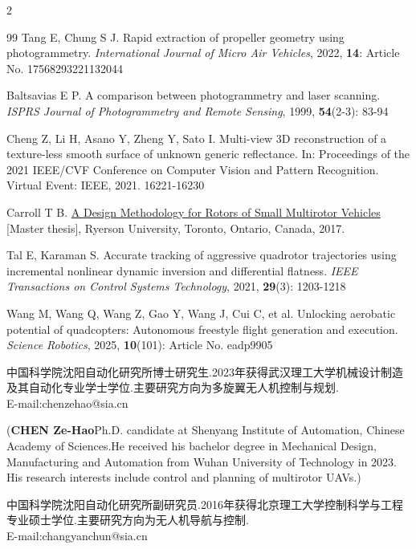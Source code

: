 \documentclass{aas}
\begin{document}
\begin{multicols}{2}
\begin{thebibliography}{99}
 Tang E, Chung S J. Rapid extraction of propeller geometry using photogrammetry. \textit{International Journal of Micro Air Vehicles}, 2022, \textbf{14}: Article No. 17568293221132044

 Baltsavias E P. A comparison between photogrammetry and laser scanning. \textit{ISPRS Journal of Photogrammetry and Remote Sensing}, 1999, \textbf{54}(2-3): 83-94

 Cheng Z, Li H, Asano Y, Zheng Y, Sato I. Multi-view 3D reconstruction of a texture-less smooth surface of unknown generic reflectance. In: Proceedings of the 2021 IEEE/CVF Conference on Computer Vision and Pattern Recognition. Virtual Event: IEEE, 2021. 16221-16230

 Carroll T B. \href{https://hdl.handle.net/20.500.15003/8776}{A Design Methodology for Rotors of Small Multirotor Vehicles} [Master thesis], Ryerson University, Toronto, Ontario, Canada, 2017.

 Tal E, Karaman S. Accurate tracking of aggressive quadrotor trajectories using incremental nonlinear dynamic inversion and differential flatness. \textit{IEEE Transactions on Control Systems Technology}, 2021, \textbf{29}(3): 1203-1218

 Wang M, Wang Q, Wang Z, Gao Y, Wang J, Cui C, et al. Unlocking aerobatic potential of quadcopters: Autonomous freestyle flight generation and execution. \textit{Science Robotics}, 2025, \textbf{10}(101): Article No. eadp9905

\end{thebibliography}

\begin{biographynophoto}
\quad 中国科学院沈阳自动化研究所博士研究生.2023年获得武汉理工大学机械设计制造及其自动化专业学士学位.主要研究方向为多旋翼无人机控制与规划.\\E-mail:chenzehao@sia.cn

\noindent({\bf CHEN Ze-Hao}\quad Ph.D. candidate at Shenyang Institute of Automation, Chinese Academy of Sciences.He received his bachelor degree in Mechanical Design, Manufacturing and Automation from Wuhan University of Technology in 2023. His research interests include control and planning of multirotor UAVs.)
\end{biographynophoto}

\begin{biography}
\samepage
{}\quad 中国科学院沈阳自动化研究所副研究员.2016年获得北京理工大学控制科学与工程专业硕士学位.主要研究方向为无人机导航与控制.\\E-mail:changyanchun@sia.cn


\end{biography}
\end{multicols}
\end{document}
